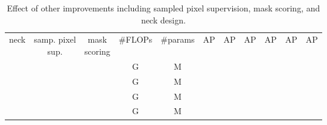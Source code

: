 \documentclass[10pt,twocolumn,letterpaper]{article}
\newcommand{\cmark}{\ding{51}}\newcommand{\xmark}{\ding{55}}
\begin{document}
\begin{table}[t]
\begin{minipage}[t]{1\linewidth}
\vspace{2mm}
\centering
\setlength{\tabcolsep}{0.5pt}
\footnotesize
\renewcommand{\arraystretch}{1.2}
\resizebox{1.0\linewidth}{!}
{
\begin{tabular}{ccc|c|c|cccccc}
   neck & \thead{samp. pixel \\ sup.} & \thead{mask \\ scoring} & \#FLOPs & \#params & AP & AP & AP & AP & AP & AP  \\
    \shline
   \xmark & \xmark & \xmark &  G &  M &  &  &  &  &  &  \\
   \cmark & \xmark & \xmark &  G &  M &  &  &  &  &  &  \\
   \cmark & \cmark & \xmark &  G &  M &  &  &  &  &  &  \\ 
  \rowcolor{gray!10}\cmark & \cmark & \cmark &  G&  M &  &  &  &  &  &  \\
\end{tabular}
}
\caption{\small{{
Effect of other improvements including sampled pixel supervision, mask scoring, and neck design.}}
}
\label{tab:other_improvement_ablate}
\end{minipage}
\end{table}
\end{document}
